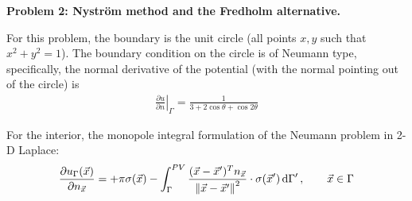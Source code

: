 \textbf{Problem 2: Nyström method and the Fredholm alternative.}

For this problem, the boundary is the unit circle (all points $x,y$ such that $x^2+y^2=1$).  The boundary condition on the circle is of Neumann type, specifically, the normal derivative of the potential (with the normal pointing out of the circle) is
\begin{align}
    \left. \frac{\partial{u}}{\partial{n}} \right|_\Gamma = \frac{1}{3+2\cos\theta +\cos2\theta}
\end{align}

For the interior, the monopole integral formulation of the Neumann problem in 2-D Laplace:
\begin{align}
    \frac{\partial{u}_\Gamma (\vec{x})}{\partial{n}_{\vec{x}}}
    = +\pi\sigma(\vec{x}) - \int_\Gamma^{PV}
    \frac{(\vec{x}-\vec{x}')^Tn_{\vec{x}}}{\norm{\vec{x}-\vec{x}'}^2}\cdot \sigma(\vec{x}') \dd{\Gamma'},
    \qquad \vec{x}\in\Gamma
\end{align}

